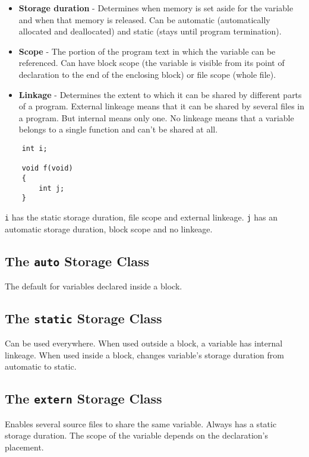 \documentclass[openany]{book}
\begin{document}
    \begin{itemize}
        \item \textbf{Storage duration} - Determines when memory is set aside for the variable and when that memory is released. Can be automatic (automatically allocated and deallocated) and static (stays until program termination).
        \item \textbf{Scope} - The portion of the program text in which the variable can be referenced. Can have block scope (the variable is visible from its point of declaration to the end of the enclosing block) or file scope (whole file).
        \item \textbf{Linkage} - Determines the extent to which it can be shared by different parts of a program. External linkeage means that it can be shared by several files in a program. But internal means only one. No linkeage means that a variable belongs to a single function and can't be shared at all.
    \end{itemize}

    \begin{lstlisting}
    int i;

    void f(void)
    {
        int j;
    }
    \end{lstlisting}
    
    \texttt{i} has the static storage duration, file scope and external linkeage. \texttt{j} has an automatic storage duration, block scope and no linkeage.

    \subsection*{The \texttt{auto} Storage Class}
    The default for variables declared inside a block.

    \subsection*{The \texttt{static} Storage Class}
    Can be used everywhere. When used outside a block, a variable has internal linkeage. When used inside a block, changes variable's storage duration from automatic to static.

    \subsection*{The \texttt{extern} Storage Class}
    Enables several source files to share the same variable. Always has a static storage duration. The scope of the variable depends on the declaration's placement.
\end{document}
